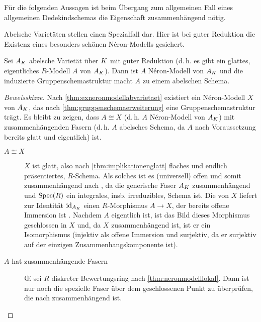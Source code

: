 \documentclass[german]{scrreprt}
\begin{document}
Für die folgenden Aussagen ist beim Übergang zum allgemeinen Fall
eines allgemeinen Dedekindschemas die Eigenschaft zusammenhängend
nötig.

Abelsche Varietäten stellen einen Spezialfall dar. Hier ist bei guter
Reduktion die Existenz eines besonders schönen Néron-Modells gesichert.
\begin{Satz}\label{thm:abelscheneronmodelle}
  Sei $A_{K}$ abelsche Varietät über $K$ mit guter Reduktion
  (d.\,h. es gibt ein glattes, eigentliches $R$-Modell $A$ von $A_{K}$).
  Dann ist $A$ Néron-Modell von $A_{K}$ und die induzierte
  Gruppenschemastruktur macht $A$ zu einem abelschen Schema.
  \cite[1.4, Proposition 2]{neron}
  \begin{proof}[Beweisskizze]
    Nach \autoref{thm:exneronmodellabvarietaet} existiert ein
    Néron-Modell $X$ von $A_{K}$, das nach
    \autoref{thm:gruppenschemaerweiterung} eine Gruppenschemastruktur
    trägt.
    Es bleibt zu zeigen, dass $A\cong X$ (d.\,h. $A$ Néron-Modell von
    $A_{K}$) mit zusammenhängenden Fasern (d.\,h. $A$ abelsches Schema,
    da $A$ nach Voraussetzung bereits glatt und eigentlich) ist.
    \begin{description}
    \item[$A\cong X$] $X$ ist glatt, also nach
      \autoref{thm:implikationenglatt} flaches und endlich
      präsentiertes, $R$-Schema.
      Als solches ist es (universell) offen \cite[Theorem 14.33]{wedhorn}
      und somit zusammenhängend nach \cite[Proposition 3.24]{wedhorn},
      da die generische Faser $A_{K}$ zusammenhängend und $\operatorname{Spec}(R)$
      ein integrales, insb. irreduzibles, Schema ist.
      Die \NAbbEig von $X$ liefert zur Identität $\mathrm{id}_{A_{K}}$ einen
      $R$-Morphismus $A\to X$, der bereits offene Immersion ist
      \cite[4.3/1 (ii) oder 4.4/1]{neron}.
      Nachdem $A$ eigentlich ist, ist das Bild dieses Morphismus
      geschlossen in $X$ und, da $X$ zusammenhängend ist, ist er ein
      Isomorphismus (injektiv als offene Immersion und surjektiv, da
      er surjektiv auf der einzigen Zusammenhangskomponente ist).
    \item[$A$ hat zusammenhängende Fasern]
      \OE{} sei $R$ diskreter Bewertungsring nach
      \autoref{thm:neronmodelllokal}.
      Dann ist nur noch die spezielle Faser über dem geschlossenen
      Punkt zu überprüfen, die nach \cite[5.5.1]{EGAIII-1} zusammenhängend
      ist.
    \end{description}
  \end{proof}
\end{Satz}
\end{document}
